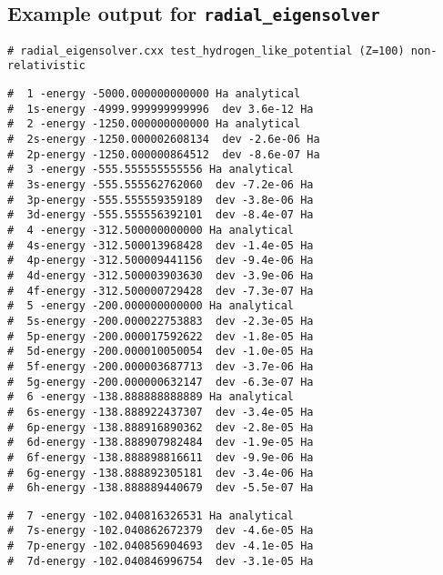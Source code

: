 \documentclass[oribibl]{llncs}
\newcommand{\ttt}[1]{\texttt{#1}}
\begin{document}
\newpage
\begin{landscape}
\subsection{Example output for \ttt{radial\_eigensolver}} \label{sec:example-output-for-radial-_eigensolver}
\small
\begin{verbatim}
# radial_eigensolver.cxx test_hydrogen_like_potential (Z=100) non-relativistic
\end{verbatim}
%
\noindent
\begin{minipage}[t]{.7\textwidth}
\raggedright
%
\begin{verbatim}
#  1 -energy -5000.000000000000 Ha analytical
#  1s-energy -4999.999999999996  dev 3.6e-12 Ha
#  2 -energy -1250.000000000000 Ha analytical
#  2s-energy -1250.000002608134  dev -2.6e-06 Ha
#  2p-energy -1250.000000864512  dev -8.6e-07 Ha
#  3 -energy -555.555555555556 Ha analytical
#  3s-energy -555.555562762060  dev -7.2e-06 Ha
#  3p-energy -555.555559359189  dev -3.8e-06 Ha
#  3d-energy -555.555556392101  dev -8.4e-07 Ha
#  4 -energy -312.500000000000 Ha analytical
#  4s-energy -312.500013968428  dev -1.4e-05 Ha
#  4p-energy -312.500009441156  dev -9.4e-06 Ha
#  4d-energy -312.500003903630  dev -3.9e-06 Ha
#  4f-energy -312.500000729428  dev -7.3e-07 Ha
#  5 -energy -200.000000000000 Ha analytical
#  5s-energy -200.000022753883  dev -2.3e-05 Ha
#  5p-energy -200.000017592622  dev -1.8e-05 Ha
#  5d-energy -200.000010050054  dev -1.0e-05 Ha
#  5f-energy -200.000003687713  dev -3.7e-06 Ha
#  5g-energy -200.000000632147  dev -6.3e-07 Ha
#  6 -energy -138.888888888889 Ha analytical
#  6s-energy -138.888922437307  dev -3.4e-05 Ha
#  6p-energy -138.888916890362  dev -2.8e-05 Ha
#  6d-energy -138.888907982484  dev -1.9e-05 Ha
#  6f-energy -138.888898816611  dev -9.9e-06 Ha
#  6g-energy -138.888892305181  dev -3.4e-06 Ha
#  6h-energy -138.888889440679  dev -5.5e-07 Ha
\end{verbatim}
%
\end{minipage}%
\begin{minipage}[t]{.7\textwidth}
\raggedleft
%
\begin{verbatim}
#  7 -energy -102.040816326531 Ha analytical
#  7s-energy -102.040862672379  dev -4.6e-05 Ha
#  7p-energy -102.040856904693  dev -4.1e-05 Ha
#  7d-energy -102.040846996754  dev -3.1e-05 Ha

\end{verbatim}
\end{minipage}
\end{landscape}
\end{document}

